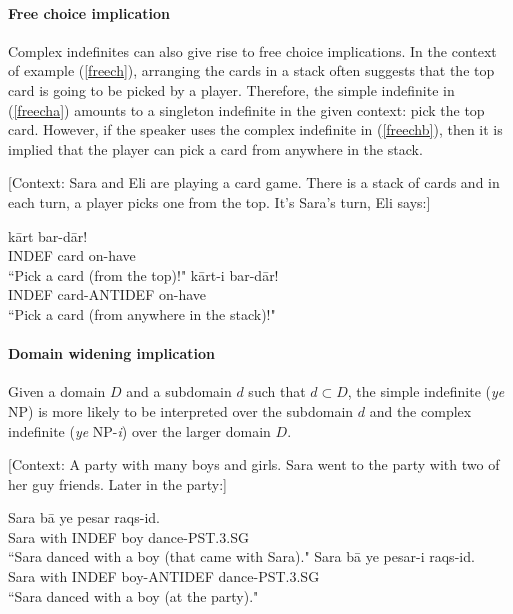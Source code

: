 \documentclass{salt}
\begin{document}
\paragraph {Free choice implication} Complex indefinites can also give rise to free choice implications. In the context of example (\ref{freech}), arranging the cards in a stack often suggests that the top card is going to be picked by a player. Therefore, the simple indefinite in (\ref{freecha}) amounts to a singleton indefinite in the given context: pick the top card. However, if the speaker uses the complex indefinite in (\ref{freechb}), then it is implied that the player can pick a card from anywhere in the stack. 

	\begin {exe}
		\ex \label{freech} {\footnotesize [Context: Sara and Eli are playing a card game. There is a stack of cards and in each turn, a player picks one from the top. It's Sara's turn, Eli says:]}
		\begin {xlist} \ex \label{freecha}
			 k\={a}rt bar-d\={a}r! \\
				{\scriptsize INDEF} card on-have\\
			\glt 	``Pick a card (from the top)!"
		\ex \label {freechb}
			 k\={a}rt-{\color {blue}i} bar-d\={a}r! \\
				{\scriptsize INDEF} card-{\scriptsize ANTIDEF} on-have\\
			\glt 	``Pick a card (from anywhere in the stack)!"
		\end {xlist}
	\end {exe}

\paragraph {Domain widening implication} Given a domain $D$ and a subdomain $d$ such that $d \subset D$, the simple indefinite (\emph{ye} NP) is more likely to be interpreted over the subdomain $d$ and the complex indefinite (\emph{ye} NP-\emph{i}) over the larger domain $D$.

	\begin {exe}
		\ex \label {dw} {\footnotesize [Context: A party with many boys and girls. Sara went to the party with two of her guy friends. Later in the party:]}
		\begin {xlist} \ex \label{smallparty}
			\gll 	Sara b\={a} {\color {red}ye} pesar 	raqs-id.\\
				Sara with	{\scriptsize INDEF} boy	dance-{\scriptsize PST.3.SG}\\
			\glt 	``Sara danced with a boy (that came with Sara)."
		\ex \label {bigparty}
			\gll 	Sara b\={a} {\color {red}ye} pesar-{\color {blue}i} 	raqs-id.\\
				Sara with	{\scriptsize INDEF} boy-{\scriptsize ANTIDEF}	dance-{\scriptsize PST.3.SG}\\
			\glt 	``Sara danced with a boy (at the party)."
		\end {xlist}
	\end {exe}
\end{document}
